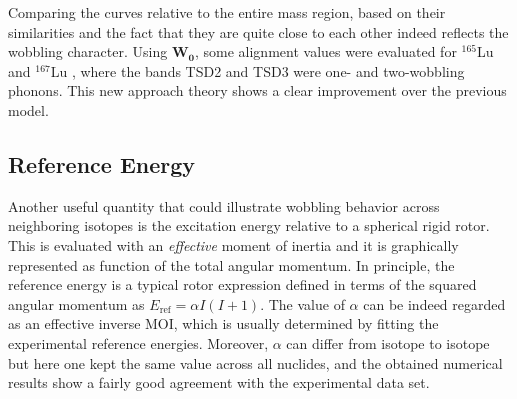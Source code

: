 Comparing the curves relative to the entire mass region, based on their similarities and the fact that they are quite close to each other indeed reflects the wobbling character. Using $\mathbf{W_0}$, some alignment values were evaluated for $^{165}$Lu and $^{167}$Lu \cite{raduta2018wobbling}, where the bands TSD2 and TSD3 were one- and two-wobbling phonons. This new approach theory shows a clear improvement over the previous model.

\subsection{Reference Energy}

Another useful quantity that could illustrate wobbling behavior across neighboring isotopes is the excitation energy relative to a spherical rigid rotor. This is evaluated with an \emph{effective} moment of inertia and it is graphically represented as function of the total angular momentum. In principle, the reference energy is a typical rotor expression defined in terms of the squared angular momentum as $E_\text{ref}=\alpha I(I+1)$. The value of $\alpha$ can be indeed regarded as an effective inverse MOI, which is usually determined by fitting the experimental reference energies. Moreover, $\alpha$ can differ from isotope to isotope but here one kept the same value across all nuclides, and the obtained numerical results show a fairly good agreement with the experimental data set.

